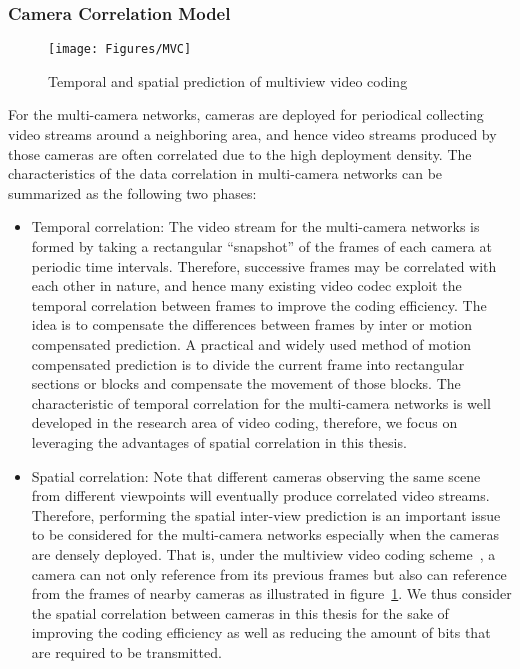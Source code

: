 \subsubsection{Camera Correlation Model}
%
\begin{figure}
\centering
\texttt{[image: Figures/MVC]}
\caption{Temporal and spatial prediction of multiview video coding\label{fig::MVC}}
\end{figure}
For the multi-camera networks, cameras are deployed for periodical collecting video streams around a neighboring area, and hence video streams produced by those cameras are often correlated due to the high deployment density.
The characteristics of the data correlation in multi-camera networks can be summarized as the following two phases:
\begin{itemize}
\item Temporal correlation: The video stream for the multi-camera networks is formed by taking a rectangular ``snapshot'' of the frames of each camera at periodic time intervals.
Therefore, successive frames may be correlated with each other in nature, and hence many existing video codec exploit the temporal correlation between frames to improve the coding efficiency.
The idea is to compensate the differences between frames by inter or motion compensated prediction.
A practical and widely used method of motion compensated prediction is to divide the current frame into rectangular sections or blocks and compensate the movement of those blocks.
The characteristic of temporal correlation for the multi-camera networks is well developed in the research area of video coding, therefore, we focus on leveraging the advantages of spatial correlation in this thesis.
\item Spatial correlation: Note that different cameras observing the same scene from different viewpoints will eventually produce correlated video streams.
Therefore, performing the spatial inter-view prediction is an important issue to be considered for the multi-camera networks especially when the cameras are densely deployed.
That is, under the multiview video coding scheme~\cite{MVCoverview}, a camera can not only reference from its previous frames but also can reference from the frames of nearby cameras as illustrated in figure~\ref{fig::MVC}.
We thus consider the spatial correlation between cameras in this thesis for the sake of improving the coding efficiency as well as reducing the amount of bits that are required to be transmitted.  
\end{itemize}
%

